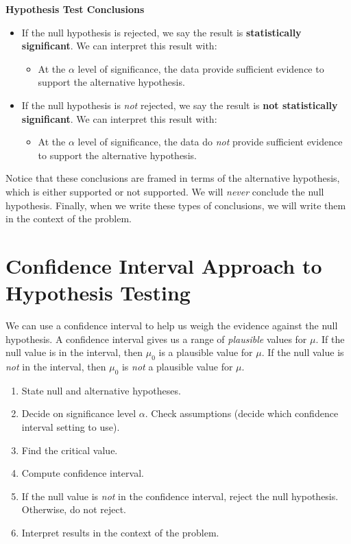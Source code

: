 \documentclass[
]{book}
\providecommand{\tightlist}{%
  \setlength{\itemsep}{0pt}\setlength{\parskip}{0pt}}
\begin{document}
\textbf{Hypothesis Test Conclusions}

\begin{itemize}
\tightlist
\item
  If the null hypothesis is rejected, we say the result is \textbf{statistically significant}. We can interpret this result with:

  \begin{itemize}
  \tightlist
  \item
    At the \(\alpha\) level of significance, the data provide sufficient evidence to support the alternative hypothesis.
  \end{itemize}
\item
  If the null hypothesis is \emph{not} rejected, we say the result is \textbf{not statistically significant}. We can interpret this result with:

  \begin{itemize}
  \tightlist
  \item
    At the \(\alpha\) level of significance, the data do \emph{not} provide sufficient evidence to support the alternative hypothesis.
  \end{itemize}
\end{itemize}

Notice that these conclusions are framed in terms of the alternative hypothesis, which is either supported or not supported. We will \emph{never} conclude the null hypothesis. Finally, when we write these types of conclusions, we will write them in the context of the problem.

\hypertarget{confidence-interval-approach-to-hypothesis-testing}{%
\section{Confidence Interval Approach to Hypothesis Testing}\label{confidence-interval-approach-to-hypothesis-testing}}

We can use a confidence interval to help us weigh the evidence against the null hypothesis. A confidence interval gives us a range of \emph{plausible} values for \(\mu\). If the null value is in the interval, then \(\mu_0\) is a plausible value for \(\mu\). If the null value is \emph{not} in the interval, then \(\mu_0\) is \emph{not} a plausible value for \(\mu\).

\begin{enumerate}
\def\labelenumi{\arabic{enumi}.}
\tightlist
\item
  State null and alternative hypotheses.
\item
  Decide on significance level \(\alpha\). Check assumptions (decide which confidence interval setting to use).
\item
  Find the critical value.
\item
  Compute confidence interval.
\item
  If the null value is \emph{not} in the confidence interval, reject the null hypothesis. Otherwise, do not reject.
\item
  Interpret results in the context of the problem.
\end{enumerate}
\end{document}
